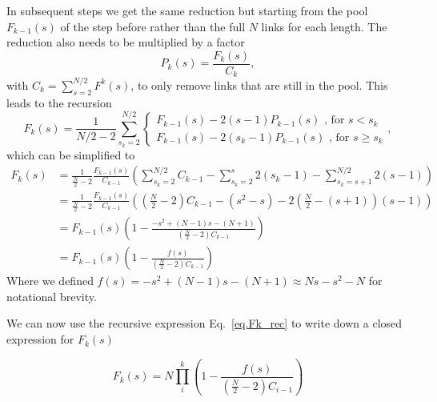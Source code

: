 \documentclass[reprint,amsmath,amssymb,rmp,onecolumn,notitlepage,11pt]{revtex4-1}
\begin{document}
In subsequent steps we get the same reduction but starting from the pool $F_{k-1}(s)$ of the step before rather than the full $N$ links for each length. The reduction also needs to be multiplied by a factor 
\begin{equation}
    P_k(s)=\frac{F_k(s)}{C_k},
    \label{eq.Pk}
\end{equation}
with $C_k=\sum_{s=2}^{N/2}F^k(s)$, to only remove links that are still in the pool. This leads to the recursion
\begin{equation}
    F_k(s)= \frac{1}{N/2-2} \sum_{s_k=2}^{N/2} {\begin{cases}
     F_{k-1}(s)-2(s-1) P_{k-1}(s) \text{ , for } s<s_k\\
     F_{k-1}(s)-2(s_k -1)P_{k-1}(s)\text{ , for } s\geq s_k
    \end{cases}},
\end{equation}
which can be simplified to
\begin{align}
   F_k(s)&= \frac{1}{\frac{N}{2}-2} \frac{F_{k-1}(s)}{C_{k-1}}\left( \sum_{s_k=2}^{N/2}C_{k-1} - \sum_{s_k=2}^{s} 2(s_k-1) - \sum_{s_k=s+1}^{N/2} 2(s -1) \right) \nonumber \\
   &= \frac{1}{\frac{N}{2}-2}\frac{F_{k-1}(s)}{C_{k-1}}\left(\left(\frac{N}{2}-2\right)C_{k-1} -(s^2-s)-2\left(\frac{N}{2}-(s+1)\right)(s-1)\right)  \nonumber \\
   &= F_{k-1}(s)\left(1-\frac{-s^2 +(N-1)s-(N+1)}{(\frac{N}{2}-2)C_{k-1}} \right)\nonumber \\
   &=F_{k-1}(s)\left(1-\frac{f(s)}{(\frac{N}{2}-2)C_{k-1}} \right)
   \label{eq.Fk_rec}
\end{align}
Where we defined $f(s)=-s^2 +(N-1)s-(N+1) \approx N s - s^2 - N$ for notational brevity.

We can now use the recursive expression Eq.~\ref{eq.Fk_rec} to write down a closed expression for $F_k(s)$

\begin{equation}
    F_k(s)=N\prod_{i}^k\left(1-\frac{f(s)}{(\frac{N}{2}-2)C_{i-1}} \right)
\end{equation}
\end{document}
